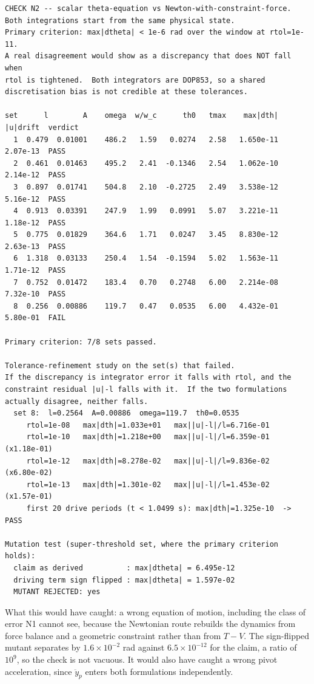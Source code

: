 \documentclass[11pt,a4paper]{article}
\begin{document}
\begin{lstlisting}
CHECK N2 -- scalar theta-equation vs Newton-with-constraint-force.
Both integrations start from the same physical state.
Primary criterion: max|dtheta| < 1e-6 rad over the window at rtol=1e-11.
A real disagreement would show as a discrepancy that does NOT fall when
rtol is tightened.  Both integrators are DOP853, so a shared
discretisation bias is not credible at these tolerances.

set      l        A    omega  w/w_c      th0   tmax    max|dth|   |u|drift  verdict
  1  0.479  0.01001    486.2   1.59   0.0274   2.58   1.650e-11   2.07e-13  PASS
  2  0.461  0.01463    495.2   2.41  -0.1346   2.54   1.062e-10   2.14e-12  PASS
  3  0.897  0.01741    504.8   2.10  -0.2725   2.49   3.538e-12   5.16e-12  PASS
  4  0.913  0.03391    247.9   1.99   0.0991   5.07   3.221e-11   1.18e-12  PASS
  5  0.775  0.01829    364.6   1.71   0.0247   3.45   8.830e-12   2.63e-13  PASS
  6  1.318  0.03133    250.4   1.54  -0.1594   5.02   1.563e-11   1.71e-12  PASS
  7  0.752  0.01472    183.4   0.70   0.2748   6.00   2.214e-08   7.32e-10  PASS
  8  0.256  0.00886    119.7   0.47   0.0535   6.00   4.432e-01   5.80e-01  FAIL

Primary criterion: 7/8 sets passed.

Tolerance-refinement study on the set(s) that failed.
If the discrepancy is integrator error it falls with rtol, and the
constraint residual |u|-l falls with it.  If the two formulations
actually disagree, neither falls.
  set 8:  l=0.2564  A=0.00886  omega=119.7  th0=0.0535
     rtol=1e-08   max|dth|=1.033e+01   max||u|-l|/l=6.716e-01
     rtol=1e-10   max|dth|=1.218e+00   max||u|-l|/l=6.359e-01  (x1.18e-01)
     rtol=1e-12   max|dth|=8.278e-02   max||u|-l|/l=9.836e-02  (x6.80e-02)
     rtol=1e-13   max|dth|=1.301e-02   max||u|-l|/l=1.453e-02  (x1.57e-01)
     first 20 drive periods (t < 1.0499 s): max|dth|=1.325e-10  -> PASS

Mutation test (super-threshold set, where the primary criterion holds):
  claim as derived          : max|dtheta| = 6.495e-12
  driving term sign flipped : max|dtheta| = 1.597e-02
  MUTANT REJECTED: yes
\end{lstlisting}

What this would have caught: a wrong equation of motion, including the class of
error N1 cannot see, because the Newtonian route rebuilds the dynamics from
force balance and a geometric constraint rather than from \(T-V\). The
sign-flipped mutant separates by \(1.6\times10^{-2}\) rad against
\(6.5\times10^{-12}\) for the claim, a ratio of \(10^{9}\), so the check is not
vacuous. It would also have caught a wrong pivot acceleration, since \(\ddot y_p\)
enters both formulations independently.
\end{document}
